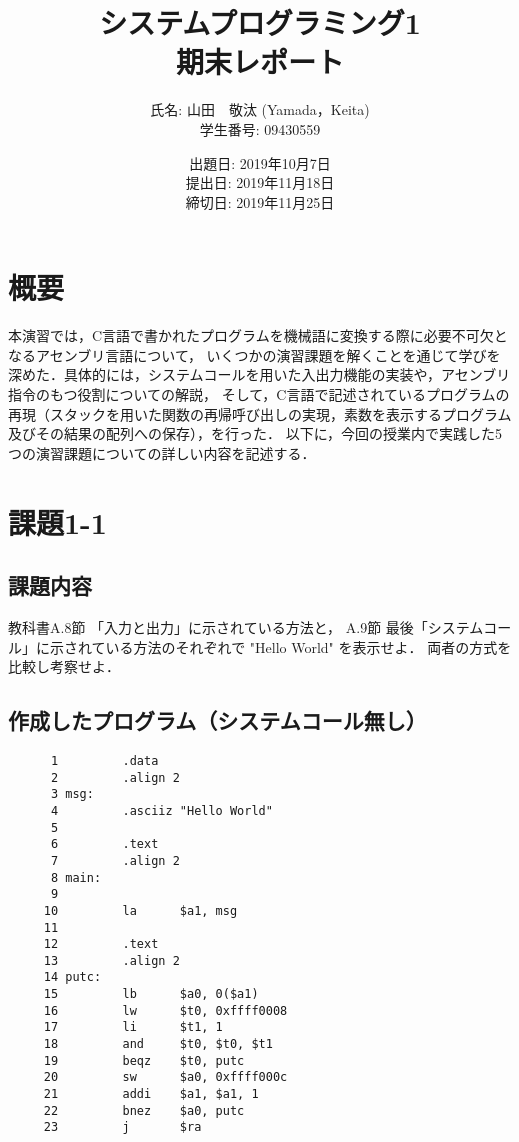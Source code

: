\documentclass[a4j,11pt]{jarticle}
\title{システムプログラミング1 \\
       期末レポート}
\author{氏名: 山田　敬汰 (Yamada，Keita) \\
        学生番号: 09430559}
\date{出題日: 2019年10月7日 \\   %
      提出日: 2019年11月18日 \\
      締切日: 2019年11月25日 \\}  %
\begin{document}
\maketitle


\section{概要}

本演習では，C言語で書かれたプログラムを機械語に変換する際に必要不可欠となるアセンブリ言語について，
いくつかの演習課題を解くことを通じて学びを深めた．具体的には，システムコールを用いた入出力機能の実装や，アセンブリ指令のもつ役割についての解説，
そして，C言語で記述されているプログラムの再現（スタックを用いた関数の再帰呼び出しの実現，素数を表示するプログラム及びその結果の配列への保存），を行った．
以下に，今回の授業内で実践した5つの演習課題についての詳しい内容を記述する．

\section{課題1-1}

\subsection{課題内容}
教科書A.8節 「入力と出力」に示されている方法と， 
A.9節 最後「システムコール」に示されている方法のそれぞれで "Hello World" を表示せよ．
両者の方式を比較し考察せよ．

\subsection{作成したプログラム（システムコール無し）}

\begin{verbatim}
      1	        .data
      2	        .align 2
      3	msg:
      4	        .asciiz "Hello World"
      5	
      6	        .text
      7	        .align 2      
      8	main:
      9	        
     10	        la      $a1, msg
     11	        
     12	        .text
     13	        .align 2  
     14	putc:
     15	        lb      $a0, 0($a1)             
     16	        lw      $t0, 0xffff0008         
     17	        li      $t1, 1                 
     18	        and     $t0, $t0, $t1          
     19	        beqz    $t0, putc               
     20	        sw      $a0, 0xffff000c         
     21	        addi    $a1, $a1, 1
     22	        bnez    $a0, putc
     23	        j       $ra                     
 
\end{verbatim}
\end{document}
